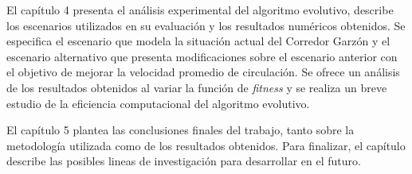 El capítulo 4 presenta el análisis experimental del algoritmo evolutivo, describe los escenarios utilizados en su evaluación y los resultados numéricos obtenidos. Se especifica el escenario que modela la situación actual del Corredor Garzón y el escenario alternativo que presenta modificaciones sobre el escenario anterior con el objetivo de mejorar la velocidad promedio de circulación. Se ofrece un análisis de los resultados obtenidos al variar la función de \emph{fitness} y se realiza un breve estudio de la eficiencia computacional del algoritmo evolutivo.

El capítulo 5 plantea las conclusiones finales del trabajo, tanto sobre la metodología utilizada como de los resultados obtenidos. Para finalizar, el capítulo describe las posibles lineas de investigación para desarrollar en el futuro.






